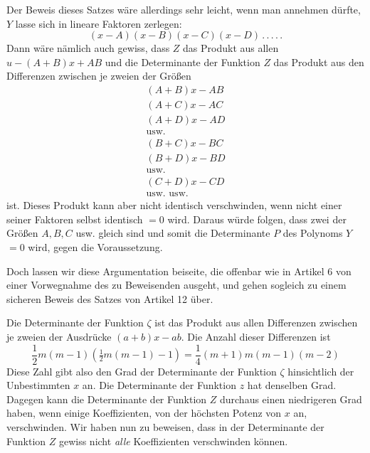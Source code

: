 Der Beweis dieses Satzes wäre allerdings sehr leicht, wenn man annehmen dürfte, $Y$ lasse sich in lineare Faktoren zerlegen:
\[
(x-A)(x-B)(x-C)(x-D)\, .\, .\, .\, .\, .
\]
Dann wäre nämlich auch gewiss, dass $Z$ das Produkt aus allen $u-(A+B)x+AB$ und die Determinante der Funktion $Z$ das Produkt aus den Differenzen zwischen je zweien der Größen
\[
\begin{gathered}
(A+B)x-AB\\
(A+C)x-AC\\
(A+D)x-AD\\
\text{usw.}\\
(B+C)x-BC\\
(B+D)x-BD\\
\text{usw.}\\
(C+D)x-CD\\
\text{usw. usw.}
\end{gathered}
\]
ist. Dieses Produkt kann aber nicht identisch verschwinden, wenn nicht einer seiner Faktoren selbst identisch $=0$ wird. Daraus würde folgen, dass zwei der Größen $A,B,C$ usw. gleich sind und somit die Determinante $P$ des Polynoms $Y$ $=0$ wird, gegen die Voraussetzung.

Doch lassen wir diese Argumentation beiseite, die offenbar wie in Artikel 6 von einer Vorwegnahme des zu Beweisenden ausgeht, und gehen sogleich zu einem sicheren Beweis des Satzes von Artikel 12 über.

Die Determinante der Funktion $\zeta$ ist das Produkt aus allen Differenzen zwischen je zweien der Ausdrücke $(a+b)x-ab$. Die Anzahl dieser Differenzen ist
\[
\frac12m(m-1)(\tfrac12m(m-1)-1)=\frac14(m+1)m(m-1)(m-2)
\]
Diese Zahl gibt also den Grad der Determinante der Funktion $\zeta$ hinsichtlich der Unbestimmten $x$ an. Die Determinante der Funktion $z$ hat denselben Grad. Dagegen kann die Determinante der Funktion $Z$ durchaus einen niedrigeren Grad haben, wenn einige Koeffizienten, von der höchsten Potenz von $x$ an, verschwinden. Wir haben nun zu beweisen, dass in der Determinante der Funktion $Z$ gewiss nicht \textit{alle} Koeffizienten verschwinden können.

